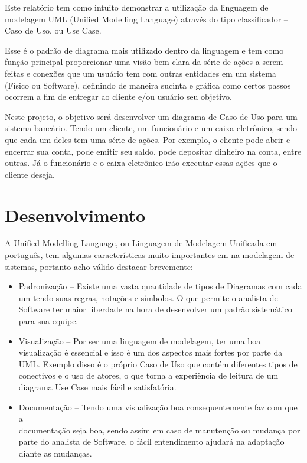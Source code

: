 \documentclass[12pt, a4paper]{article}
\begin{document}
Este relatório tem como intuito demonstrar a utilização da linguagem
de modelagem UML (Unified Modelling Language) através do tipo
classificador – Caso de Uso, ou Use Case.

Esse é o padrão de diagrama mais utilizado dentro da linguagem e tem
como função principal proporcionar uma visão bem clara da série de ações a
serem feitas e conexões que um usuário tem com outras entidades em um
sistema (Físico ou Software), definindo de maneira sucinta e gráfica como
certos passos ocorrem a fim de entregar ao cliente e/ou usuário seu objetivo.

Neste projeto, o objetivo será desenvolver um diagrama de Caso de
Uso para um sistema bancário. Tendo um cliente, um funcionário e um caixa
eletrônico, sendo que cada um deles tem uma série de ações. Por exemplo, o
cliente pode abrir e encerrar sua conta, pode emitir seu saldo, pode depositar
dinheiro na conta, entre outras. Já o funcionário e o caixa eletrônico irão
executar essas ações que o cliente deseja.

\newpage
\vspace{1cm}
\section{Desenvolvimento}

A Unified Modelling Language, ou Linguagem de Modelagem
Unificada em português, tem algumas características muito importantes em
na modelagem de sistemas, portanto acho válido destacar brevemente:
\begin{itemize}
   \item Padronização – Existe uma vasta quantidade de tipos de Diagramas
com cada um tendo suas regras, notações e símbolos. O que permite o
analista de Software ter maior liberdade na hora de desenvolver um padrão
sistemático para sua equipe.

   \item Visualização – Por ser uma linguagem de modelagem, ter uma boa
visualização é essencial e isso é um dos aspectos mais fortes por parte da
UML. Exemplo disso é o próprio Caso de Uso que contém diferentes tipos
de conectivos e o uso de atores, o que torna a experiência de leitura de um
diagrama Use Case mais fácil e satisfatória.

   \item Documentação – Tendo uma visualização boa consequentemente faz
com que a \\documentação seja boa, sendo assim em caso de manutenção ou
mudança por parte do analista de Software, o fácil entendimento ajudará na
adaptação diante as mudanças.
\end{itemize}
\end{document}
